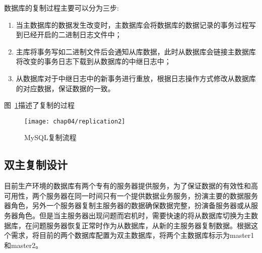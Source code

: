 数据库的复制过程主要可以分为三步:
\begin{enumerate}
\item 当主数据库的数据发生改变时，主数据库会将数据库的数据记录的事务过程写到已经开启的二进制日志文件中；
\item 主库将事务写如二进制文件后会通知从库数据，此时从数据库会链接主数据库将改变的事务日志下载到从数据库的中继日志中；
\item 从数据库对于中继日志中的新事务进行重放，根据日志操作方式修改从数据库的对应数据，保证数据的一致\cite{秦金2013分布式}。
\end{enumerate}
图~\ref{fig:replication2}描述了复制的过程
\begin{figure}[H] %
  \centering
  \texttt{[image: chap04/replication2]}
  \caption{MySQL复制流程}
  \label{fig:replication2}
\end{figure}




\subsection{双主复制设计}
目前生产环境的数据库有两个专有的服务器提供服务，为了保证数据的有效性和高可用性，两个服务器在同一时间只有一个提供数据业务服务，扮演主要的数据服务器角色，另外一个服务器复制主服务器的数据确保数据完整，扮演备服务器或从服务器角色。但是当主服务器出现问题而宕机时，需要快速的将从数据库切换为主数据库，在问题服务器恢复正常时作为从数据库，从新的主服务器复制数据。根据这个需求，将目前的两个数据库配置为双主数据库，将两个主数据库标示为master1和master2。

